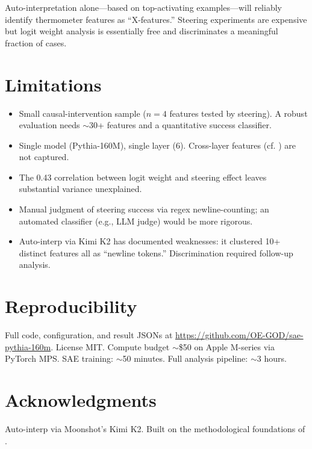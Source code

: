\documentclass[11pt]{article}
\begin{document}
Auto-interpretation alone---based on top-activating examples---will reliably
identify thermometer features as ``X-features.'' Steering experiments are
expensive but logit weight analysis is essentially free and discriminates a
meaningful fraction of cases.

\section{Limitations}

\begin{itemize}[leftmargin=*]
  \item Small causal-intervention sample ($n{=}4$ features tested by steering).
        A robust evaluation needs $\sim$30+ features and a quantitative success
        classifier.
  \item Single model (Pythia-160M), single layer (6). Cross-layer features
        (cf. \citep{lindsey2024crosscoders}) are not captured.
  \item The 0.43 correlation between logit weight and steering effect leaves
        substantial variance unexplained.
  \item Manual judgment of steering success via regex newline-counting; an
        automated classifier (e.g., LLM judge) would be more rigorous.
  \item Auto-interp via Kimi K2 has documented weaknesses: it clustered 10+
        distinct features all as ``newline tokens.'' Discrimination required
        follow-up analysis.
\end{itemize}

\section{Reproducibility}

Full code, configuration, and result JSONs at
\url{https://github.com/OE-GOD/sae-pythia-160m}. License MIT. Compute budget
$\sim$\$50 on Apple M-series via PyTorch MPS. SAE training: $\sim$50 minutes.
Full analysis pipeline: $\sim$3 hours.

\section*{Acknowledgments}

Auto-interp via Moonshot's Kimi K2. Built on the methodological foundations of
\citep{bricken2023monosemanticity,gao2024scaling,lieberum2024gemma,rajamanoharan2024gated}.



\end{document}
